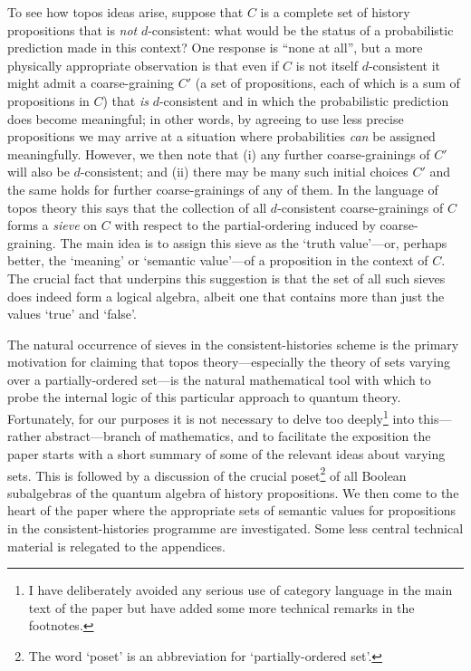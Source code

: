 	To see how topos ideas arise, suppose that $C$ is a complete set
of history propositions that is {\em not\/} $d$-consistent: what
would be the status of a probabilistic prediction made in this
context? One response is ``none at all'', but a more physically
appropriate observation is that even if $C$ is not itself
$d$-consistent it might admit a coarse-graining $C'$ (\ie a set of
propositions, each of which is a sum of propositions in $C$)
that {\em is\/} $d$-consistent and in which the probabilistic
prediction does become meaningful; in other words, by agreeing to
use less precise propositions we may arrive at a situation where
probabilities {\em can\/} be assigned meaningfully.  However, we
then note that (i) any further coarse-grainings of $C'$ will also be
$d$-consistent; and (ii) there may be many such initial choices $C'$
and the same holds for further coarse-grainings of any of them.  In
the language of topos theory this says that the collection of all
$d$-consistent coarse-grainings of $C$ forms a {\em sieve\/} on $C$
with respect to the partial-ordering induced by coarse-graining. The
main idea is to assign this sieve as the `truth value'---or, perhaps
better, the `meaning' or `semantic value'---of a proposition in the
context of $C$. The crucial fact that underpins this suggestion is
that the set of all such sieves does indeed form a logical algebra,
albeit one that contains more than just the values `true' and
`false'.

	The natural occurrence of sieves in the consistent-histories
scheme is the primary motivation for claiming that topos
theory---especially the theory of sets varying over a
partially-ordered set---is the natural mathematical tool with which
to probe the internal logic of this particular approach to quantum
theory.  Fortunately, for our purposes it is not necessary to delve
too deeply\footnote{I have deliberately avoided any serious use of
category language in the main text of the paper but have added some
more technical remarks in the footnotes.} into this---rather
abstract---branch of mathematics, and to facilitate the exposition the
paper starts with a short summary of some of the relevant ideas
about varying sets. This is followed by a discussion of the crucial
poset\footnote{The word `poset' is an abbreviation for
`partially-ordered set'.} of all Boolean subalgebras of the quantum
algebra of history propositions. We then come to the heart of the
paper where the appropriate sets of semantic values for propositions
in the consistent-histories programme are investigated. Some less
central technical material is relegated to the appendices.


